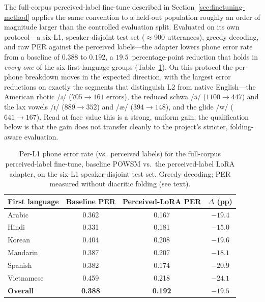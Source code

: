 \documentclass[a4paper,12pt]{report}
\newcommand{\ipa}[1]{{\ipafont #1}}
\begin{document}
The full-corpus perceived-label fine-tune described in Section~\ref{sec:finetuning-method} applies the same convention to a held-out population roughly an order of magnitude larger than the controlled evaluation split. Evaluated on its own protocol---a six-L1, speaker-disjoint test set ($\approx$900 utterances), greedy decoding, and raw PER against the perceived labels---the adapter lowers phone error rate from a baseline of $0.388$ to $0.192$, a $19.5$~percentage-point reduction that holds in \emph{every one} of the six first-language groups (Table~\ref{table:l2aFullPerL1}). On this protocol the per-phone breakdown moves in the expected direction, with the largest error reductions on exactly the segments that distinguish L2 from native English---the American rhotic \ipa{/ɹ/} ($705 \rightarrow 161$ errors), the reduced schwa \ipa{/ə/} ($1100 \rightarrow 447$) and the lax vowels \ipa{/ɪ/} ($889 \rightarrow 352$) and \ipa{/æ/} ($394 \rightarrow 148$), and the glide \ipa{/w/} ($641 \rightarrow 167$). Read at face value this is a strong, uniform gain; the qualification below is that the gain does not transfer cleanly to the project's stricter, folding-aware evaluation.

\begin{table}[h]
\centering
\caption[Full L2-ARCTIC perceived-label fine-tune, per-L1 PER]{Per-L1 phone error rate (vs.\ perceived labels) for the full-corpus perceived-label fine-tune, baseline POWSM vs.\ the perceived-label LoRA adapter, on the six-L1 speaker-disjoint test set. Greedy decoding; PER measured without diacritic folding (see text).}
\label{table:l2aFullPerL1}
\begin{tabular}{|l|c|c|c|} \hline
\textbf{First language} & \textbf{Baseline PER} & \textbf{Perceived-LoRA PER} & \textbf{$\Delta$ (pp)} \\\hline
Arabic     & 0.362 & 0.167 & $-19.4$ \\\hline
Hindi      & 0.331 & 0.181 & $-15.0$ \\\hline
Korean     & 0.404 & 0.208 & $-19.6$ \\\hline
Mandarin   & 0.387 & 0.207 & $-18.1$ \\\hline
Spanish    & 0.382 & 0.174 & $-20.9$ \\\hline
Vietnamese & 0.459 & 0.218 & $-24.1$ \\\hline
\textbf{Overall} & \textbf{0.388} & \textbf{0.192} & $\mathbf{-19.5}$ \\\hline
\end{tabular}
\end{table}
\end{document}
